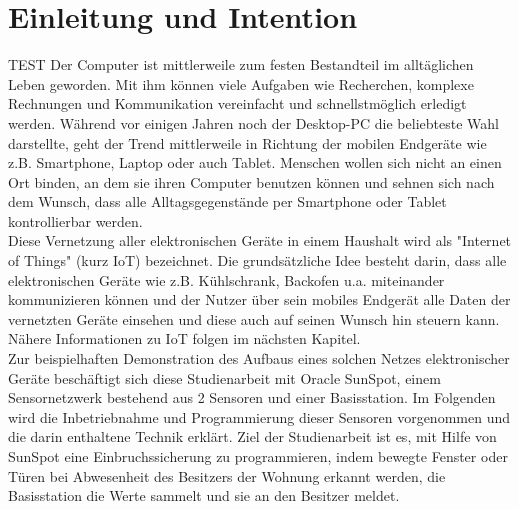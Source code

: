 \chapter{Einleitung und Intention}\label{c:Einleitung} %

TEST Der Computer ist mittlerweile zum festen Bestandteil im alltäglichen Leben geworden. Mit ihm können viele Aufgaben wie Recherchen, komplexe Rechnungen und Kommunikation vereinfacht und schnellstmöglich erledigt werden. Während vor einigen Jahren noch der Desktop-PC die beliebteste Wahl darstellte, geht der Trend mittlerweile in Richtung der mobilen Endgeräte wie z.B. Smartphone, Laptop oder auch Tablet. Menschen wollen sich nicht an einen Ort binden, an dem sie ihren Computer benutzen können und sehnen sich nach dem Wunsch, dass alle Alltagsgegenstände per Smartphone oder Tablet kontrollierbar werden.\\

Diese Vernetzung aller elektronischen Geräte in einem Haushalt wird als "Internet of Things" (kurz IoT) bezeichnet. Die grundsätzliche Idee besteht darin, dass alle elektronischen Geräte wie z.B. Kühlschrank, Backofen u.a. miteinander kommunizieren können und der Nutzer über sein mobiles Endgerät alle Daten der vernetzten Geräte einsehen und diese auch auf seinen Wunsch hin steuern kann. Nähere Informationen zu IoT folgen im nächsten Kapitel.\\

Zur beispielhaften Demonstration des Aufbaus eines solchen Netzes elektronischer Geräte beschäftigt sich diese Studienarbeit mit Oracle SunSpot, einem Sensornetzwerk bestehend aus 2 Sensoren und einer Basisstation. Im Folgenden wird die Inbetriebnahme und Programmierung dieser Sensoren vorgenommen und die darin enthaltene Technik erklärt. Ziel der Studienarbeit ist es, mit Hilfe von SunSpot eine Einbruchssicherung zu programmieren, indem bewegte Fenster oder Türen bei Abwesenheit des Besitzers der Wohnung erkannt werden, die Basisstation die Werte sammelt und sie an den Besitzer meldet.